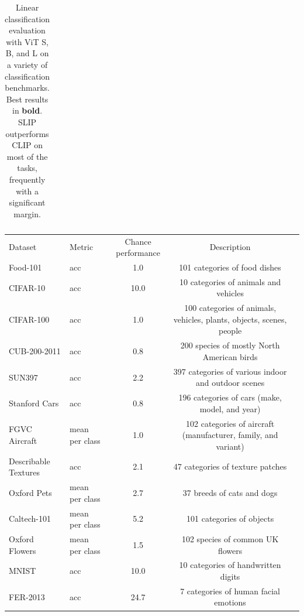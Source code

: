 \documentclass[10pt,twocolumn,letterpaper]{article}
\newcommand{\tablestyle}[2]{\setlength{\tabcolsep}{#1}\renewcommand{\arraystretch}{#2}\centering\footnotesize}
\begin{document}
\begin{table}[ht]
\begin{tabular}{ll cccccccccccccccccccccccccc|c}
\hline
\end{tabular}
\caption{Linear classification evaluation with ViT S, B, and L on a variety of classification benchmarks. Best results in \textbf{bold}. SLIP outperforms CLIP on most of the tasks, frequently with a significant margin.}
\label{tab:downstream-linear}
\end{table}

\begin{table}[h]
\tablestyle{2pt}{1.1}
\begin{tabular}{l l c c c}
Dataset & Metric & Chance performance & Description \\
\shline
Food-101 \cite{bossard14} & acc & 1.0 & 101 categories of food dishes \\
CIFAR-10 \cite{Krizhevsky2009LearningML} & acc & 10.0 & 10 categories of animals and vehicles \\
CIFAR-100 \cite{Krizhevsky2009LearningML} & acc & 1.0 & 100 categories of animals, vehicles, plants, objects, scenes, people \\
CUB-200-2011 \cite{WahCUB_200_2011} & acc & 0.8 & 200 species of mostly North American birds\\
SUN397 \cite{Xiao2010SUNDL} & acc & 2.2 & 397 categories of various indoor and outdoor scenes \\
Stanford Cars \cite{KrauseStarkDengFei-Fei_3DRR2013} & acc & 0.8 & 196 categories of cars (make, model, and year) \\
FGVC Aircraft \cite{maji13fine-grained} & mean per class & 1.0 & 102 categories of aircraft (manufacturer, family, and variant) \\
Describable Textures \cite{cimpoi14describing} & acc & 2.1 & 47 categories of texture patches \\
Oxford Pets \cite{Parkhi2012CatsAD} & mean per class & 2.7 & 37 breeds of cats and dogs \\
Caltech-101 \cite{FeiFei2006OneshotLO} & mean per class & 5.2 & 101 categories of objects \\
Oxford Flowers \cite{Nilsback2008AutomatedFC} & mean per class & 1.5 & 102 species of common UK flowers \\
MNIST \cite{LeCun1998GradientbasedLA} & acc & 10.0 & 10 categories of handwritten digits\\
FER-2013 \cite{Goodfellow2013ChallengesIR} & acc & 24.7 & 7 categories of human facial emotions\\

\end{tabular}
\end{table}
\end{document}
